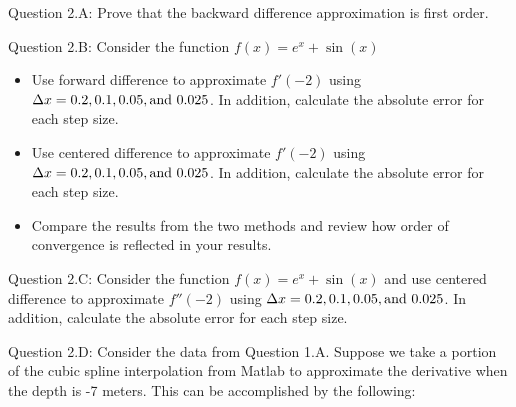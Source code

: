 \documentclass{article}
\def\ds{\displaystyle}
\begin{document}
\par \medskip \noindent
%
Question 2.A: Prove that the backward difference approximation is first order. 

 \medskip \par \noindent
%
Question 2.B: Consider the function $\ds f(x) = e^x + \sin(x)$
\begin{itemize}
    \item Use forward difference to approximate $\ds f'(-2)$ using $\ds \Delta x = 0.2, 0.1, 0.05, {\rm and} \ 0.025$. In addition, calculate the absolute error for each step size. 
    \item Use centered difference to approximate $\ds f'(-2)$ using $\ds \Delta x = 0.2, 0.1, 0.05, {\rm and} \ 0.025$. In addition, calculate the absolute error for each step size.
    \item Compare the results from the two methods and review how order of convergence is reflected in your results. 
\end{itemize}

 \medskip \par \noindent
%
Question 2.C:   Consider the function $\ds f(x) = e^x + \sin(x)$ and use centered difference to approximate $\ds f''(-2)$ using $\ds \Delta x = 0.2, 0.1, 0.05, {\rm and} \ 0.025$. In addition, calculate the absolute error for each step size. 
\medskip \par \noindent
%
Question 2.D: Consider the data from Question 1.A. Suppose we take a portion of the cubic spline interpolation from Matlab to approximate the derivative when the depth is -7 meters. This can be accomplished by the following: 
\end{document}
